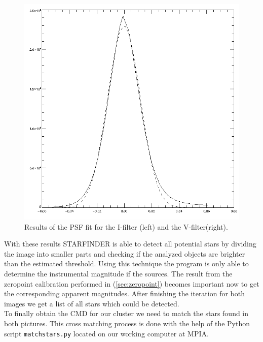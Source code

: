 \begin{figure}[H]
\begin{minipage}{0.2\textwidth}
\vspace{3pt}
\hspace{15pt}
		\includegraphics[scale=0.148]{figures/Exposures/psf_noise_V.png}
\end{minipage}
\caption{Results of the PSF fit for the I-filter (left) and the V-filter(right).} 
\end{figure} 

With these results STARFINDER is able to detect all potential stars by dividing the image into smaller parts and checking if the analyzed objects are brighter than the estimated threshold. 
Using this technique the program is only able to determine the instrumental magnitude if the sources. The result from the zeropoint calibration performed in (\ref{sec:zeropoint}) becomes important now to get the corresponding apparent magnitudes.
After finishing the iteration for both images we get a list of all stars which could be detected. \\
To finally obtain the CMD for our cluster we need to match the stars found in both pictures. This cross matching process is done with the help of the Python script \texttt{matchstars.py} located on our working computer at MPIA. \\ 

